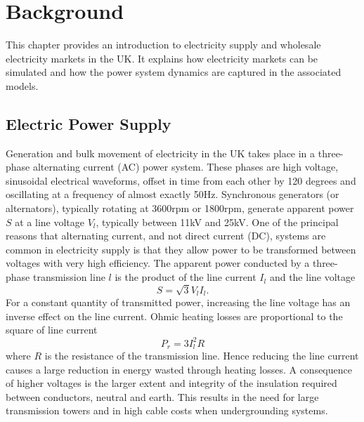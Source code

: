 \chapter{Background}
\label{ch:background}
This chapter provides an introduction to electricity supply and wholesale
electricity markets in the UK.  It explains how electricity markets can be
simulated and how the power system dynamics are captured in the associated
models.

\section{Electric Power Supply}

%

Generation and bulk movement of electricity in the UK takes place in a
three-phase alternating current (AC) power system.  These phases are
high voltage, sinusoidal electrical waveforms, offset in time from each
other by 120 degrees and oscillating at a frequency of almost exactly 50Hz.
Synchronous generators (or alternators), typically rotating at 3600rpm or
1800rpm, generate apparent power $S$ at a line voltage $V_l$, typically
between 11kV and 25kV.  One of the principal reasons that alternating current,
and not direct current (DC), systems are common in electricity supply is that
they allow power to be transformed between voltages with very high efficiency.
The apparent power conducted by a three-phase transmission line $l$ is the
product of the line current $I_l$ and the line voltage
\begin{equation}
S = \sqrt{3} V_l I_l .
\end{equation}
For a constant quantity of transmitted power, increasing the line voltage has
an inverse effect on the line current.  Ohmic heating losses are proportional to the
square of line current
\begin{equation}
P_{r} = 3 I_l^2 R
\end{equation}
where $R$ is the resistance of the transmission line.  Hence reducing the line
current causes a large reduction in energy wasted through heating losses.  A
consequence of higher voltages is the larger extent and integrity of the
insulation required between conductors, neutral and earth.  This results in
the need for large transmission towers and in high cable costs when
undergrounding systems.

